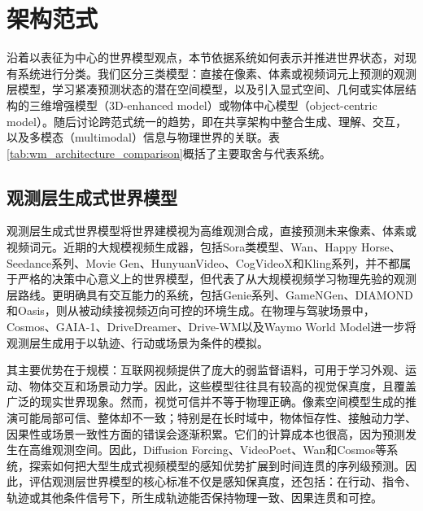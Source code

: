 \section{架构范式}
沿着以表征为中心的世界模型观点，本节依据系统如何表示并推进世界状态，对现有系统进行分类。我们区分三类模型：直接在像素、体素或视频词元上预测的观测层模型，学习紧凑预测状态的潜在空间模型，以及引入显式空间、几何或实体层结构的三维增强模型（3D-enhanced model）或物体中心模型（object-centric model）。随后讨论跨范式统一的趋势，即在共享架构中整合生成、理解、交互，以及多模态（multimodal）信息与物理世界的关联。表\ref{tab:wm_architecture_comparison}概括了主要取舍与代表系统。

\subsection{观测层生成式世界模型}
观测层生成式世界模型将世界建模视为高维观测合成，直接预测未来像素、体素或视频词元。近期的大规模视频生成器，包括Sora类模型\citep{openai2024sora}、Wan\citep{wan2025wan}、Happy Horse\citep{happyhorse2026}、Seedance系列\citep{gao2025seedance,seedance2026seedance2}、Movie Gen\citep{polyak2024moviegen}、HunyuanVideo\citep{kong2024hunyuanvideo}、CogVideoX\citep{yang2024cogvideox}和Kling系列\citep{kling2025omni}，并不都属于严格的决策中心意义上的世界模型，但代表了从大规模视频学习物理先验的观测层路线。更明确具有交互能力的系统，包括Genie系列\citep{bruce2024genie,parkerholder2024genie2,genie3}、GameNGen\citep{valevski2025gamengen}、DIAMOND\citep{alonso2024diamond}和Oasis\citep{decart2024oasis}，则从被动续接视频迈向可控的环境生成。在物理与驾驶场景中，Cosmos\citep{nvidia2025cosmos}、GAIA-1\citep{hu2023gaia1}、DriveDreamer\citep{wang2023drivedreamer}、Drive-WM\citep{wang2023drivewm}以及Waymo World Model\citep{waymo2026worldmodel}进一步将观测层生成用于以轨迹、行动或场景为条件的模拟。

其主要优势在于规模：互联网视频提供了庞大的弱监督语料，可用于学习外观、运动、物体交互和场景动力学。因此，这些模型往往具有较高的视觉保真度，且覆盖广泛的现实世界现象。然而，视觉可信并不等于物理正确。像素空间模型生成的推演可能局部可信、整体却不一致；特别是在长时域中，物体恒存性、接触动力学、因果性或场景一致性方面的错误会逐渐积累。它们的计算成本也很高，因为预测发生在高维观测空间。因此，Diffusion Forcing\citep{chen2024diffusionforcing}、VideoPoet\citep{kondratyuk2024videopoet}、Wan\citep{wan2025wan}和Cosmos\citep{nvidia2025cosmos}等系统，探索如何把大型生成式视频模型的感知优势扩展到时间连贯的序列级预测。因此，评估观测层世界模型的核心标准不仅是感知保真度，还包括：在行动、指令、轨迹或其他条件信号下，所生成轨迹能否保持物理一致、因果连贯和可控。

